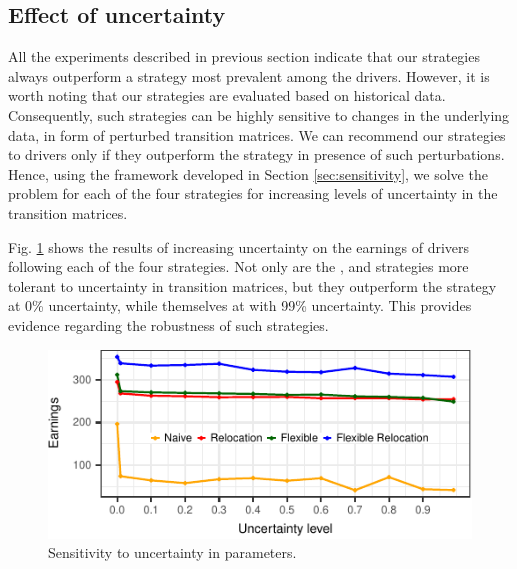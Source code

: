 \subsection{Effect of uncertainty} 

All the experiments described in previous section indicate that our strategies always outperform a {\naive} strategy most prevalent among the drivers. However, it is worth noting that our strategies are evaluated based on historical data. Consequently, such strategies can be highly sensitive to changes in the underlying data, in form of perturbed transition matrices. We can recommend our strategies to drivers only if they outperform the {\naive} strategy in presence of such perturbations. Hence, using the framework developed in Section \ref{sec:sensitivity}, we solve the {\robustproblem} problem for each of the four strategies for increasing levels of uncertainty in the transition matrices.

Fig. \ref{fig:uncertainty_evolution} shows the results of increasing uncertainty on the earnings of drivers following each of the four strategies. Not only are the {\relocation}, {\flexible} and {\relocationflexible} strategies more tolerant to uncertainty in transition matrices, but they outperform the {\naive} strategy at 0\% uncertainty, while themselves at with 99\% uncertainty. This provides evidence regarding the robustness of such strategies.

\begin{figure}[H]
	\centering
	\caption{Sensitivity to uncertainty in parameters.}
	\label{fig:uncertainty_evolution}
	\includegraphics{figures/uncertainty_evolution.pdf}
\end{figure}



